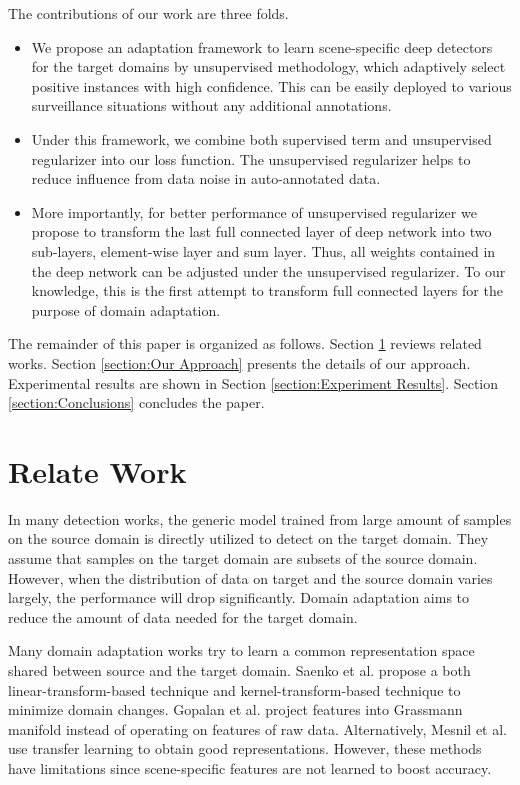 \documentclass[runningheads]{llncs}
\begin{document}
The contributions of our work are three folds.
\begin{itemize}
\item We propose an adaptation framework to learn scene-specific deep detectors for the target domains by unsupervised methodology, which adaptively select positive instances with high confidence. This can be easily deployed to various surveillance situations without any additional annotations.
\item Under this framework, we combine both supervised term and unsupervised regularizer into our loss function. The unsupervised regularizer helps to reduce influence from data noise in auto-annotated data.
\item More importantly, for better performance of unsupervised regularizer we propose to transform the last full connected layer of deep network into two sub-layers, element-wise layer and sum layer. Thus, all weights contained in the deep network can be adjusted under the unsupervised regularizer. To our knowledge, this is the first attempt to transform full connected layers for the purpose of domain adaptation.
\end{itemize}

The remainder of this paper is organized as follows. Section \ref{section:Relate Work} reviews related works. Section \ref{section:Our Approach} presents the details of our approach. Experimental results are shown in Section \ref{section:Experiment Results}. Section \ref{section:Conclusions} concludes the paper.

\section{Relate Work}
\label{section:Relate Work}

In many detection works, the generic model trained from large amount of samples on the source domain is directly utilized to detect on the target domain. They assume that samples on the target domain are subsets of the source domain. However, when the distribution of data on target and the source domain varies largely, the performance will drop significantly. Domain adaptation aims to reduce the amount of data needed for the target domain.

Many domain adaptation works try to learn a common representation space shared between source and the target domain. Saenko et al. \cite{saenko2010adapting,kulis2011you} propose a both linear-transform-based technique and kernel-transform-based technique to minimize domain changes. Gopalan et al. \cite{gopalan2011domain} project features into Grassmann manifold instead of operating on features of raw data. Alternatively, Mesnil et al. \cite{mesnil2012unsupervised} use transfer learning to obtain good representations. However, these methods have limitations since scene-specific features are not learned to boost accuracy. 
\end{document}

